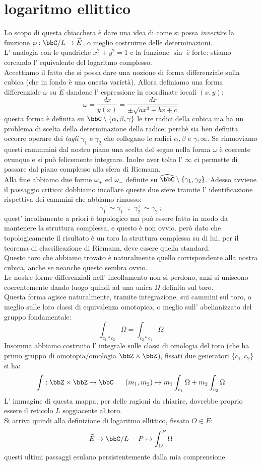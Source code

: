 \section{logaritmo ellittico}
Lo scopo di questa chiacchera è dare una idea di come si possa {\it invertire} la funzione $\wp: \bbC/L \rar \widetilde{E}$, o meglio costruirne delle determinazioni.\\
L' analogia con le quadriche $x^2+y^2=1$ e la funzione $\sin$ è forte: stiamo cercando l' equivalente del logaritmo complesso.\\
Accettiamo il fatto che si possa dare una nozione di forma differenziale sulla cubica (che in fondo è una onesta varietà). Allora definiamo una forma differenziale $\omega$ su $\widetilde{E}$ dandone l' espressione in coordinate locali $(x,y)$:
$$
\omega=\frac{dx}{y(x)}=\frac{dx}{\pm\sqrt{ax^3+bx+c}}
$$
questa forma è definita su $\bbC\setminus\{\alpha, \beta, \gamma\}$ le tre radici della cubica ma ha un problema di scelta della determinazione della radice; perchè sia ben definita occorre operare dei {\it tagli} $\gamma_1$ e $\gamma_2$ che collegano le radici $\alpha,\beta$ e $\gamma,\infty$. Se rimuoviamo questi cammmini dal nostro piano una scelta del segno nella forma $\omega$ è coerente ovunque e si può felicemente integrare. Inolre aver tolto l' $\infty$ ci permette di passare dal piano complesso alla sfera di Riemann.\\
Alla fine abbiamo due forme $\omega_+$ ed $\omega_-$ definite su $\widehat{\bbC}\setminus\{\gamma_1,\gamma_2\}$. Adesso avviene il passaggio critico: dobbiamo incollare queste due sfere tramite l' identificazione rispettiva dei cammini che abbiamo rimosso:
$$
\gamma_1^+\sim \gamma_1^-\ \ , \ \ \gamma_2^+\sim\gamma_2^-;
$$
quest' incollamente a priori è topologico ma può essere fatto in modo da mantenere la struttura complessa, e questo è non ovvio. però dato che topologicamente il risultato è un toro la struttura complessa su di lui, per il teorema di classificazione di Riemann, deve essere quella standard.\\
Questo toro che abbiamo trovato è naturalmente quello corrispondente alla nostra cubica, anche se neanche questo sembra ovvio.\\
Le nostre forme differenziali nell' incollamento non si perdono, anzi si uniscono coerentemente dando luogo quindi ad una unica $\Omega$ definita sul toro.\\
Questa forma agisce naturalmente, tramite integrazione, sui cammini sul toro, o meglio sulle loro classi di equivalenza omotopica, o meglio sull' abelianizzato del gruppo fondamentale:
$$
\int_{c_1 * c_2} \Omega=\int_{c_2 * c_1} \Omega
$$ 
Insomma abbiamo costruito l' integrale sulle classi di omologia del toro (che ha primo gruppo di omotopia/omologia $\bbZ\times \bbZ $), fissati due generatori $\{c_1,c_2\}$ si ha:
$$
\int: \bbZ\times \bbZ \rar \bbC \ \ \ \ \ (m_1,m_2)\mapsto m_1 \int_{c_1} \Omega+m_2 \int_{c_2} \Omega  
$$
L' immagine di questa mappa, per delle ragioni da chiarire, dovrebbe proprio essere il reticolo $L$ soggiacente al toro.\\
Si arriva quindi alla definizione di logaritmo ellittico, fissato $O\in \widetilde{E}$:
$$
\widetilde{E}\rar \bbC/L\ \ \ \ P\mapsto \int_O^P \Omega  
$$
questi ultimi passaggi esulano persistentemente dalla mia comprensione.

